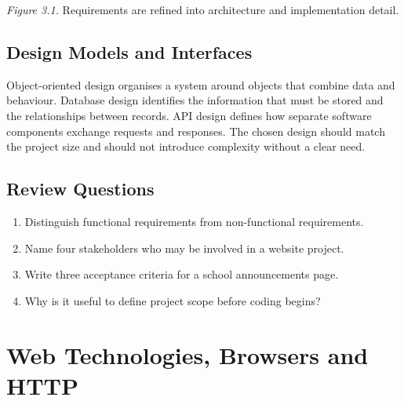\documentclass[11pt,openany,oneside]{book}
\begin{document}
\begin{center}
\end{center}
\textit{Figure 3.1.} Requirements are refined into architecture and implementation detail.

\section{Design Models and Interfaces}
Object-oriented design organises a system around objects that combine data and behaviour. Database design identifies the information that must be stored and the relationships between records. API design defines how separate software components exchange requests and responses. The chosen design should match the project size and should not introduce complexity without a clear need.

\section*{Review Questions}
\begin{enumerate}
\item Distinguish functional requirements from non-functional requirements.
\item Name four stakeholders who may be involved in a website project.
\item Write three acceptance criteria for a school announcements page.
\item Why is it useful to define project scope before coding begins?
\end{enumerate}

\chapter{Web Technologies, Browsers and HTTP}
\end{document}

